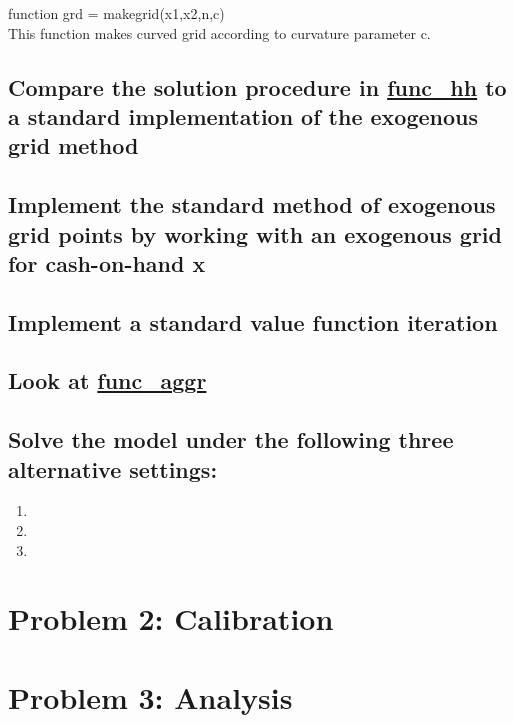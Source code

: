 \documentclass[12pt,a4paper]{article}
\newcommand\purl[1]{\protect\url{#1}} %
\begin{document}
function grd = makegrid(x1,x2,n,c) \\
This function makes curved grid according to curvature parameter c. \\

\subsection*{Compare the solution procedure in \purl{func_hh} to a standard implementation of the exogenous grid method}

\subsection*{Implement the standard method of exogenous grid points by working with an exogenous grid for cash-on-hand x}

\subsection*{Implement a standard value function iteration}

\subsection*{Look at \purl{func_aggr}}

\subsection*{Solve the model under the following three alternative settings:}

\begin{enumerate}
\item
\item
\item
\end{enumerate}

\section*{Problem 2: Calibration}

\section*{Problem 3: Analysis}
\end{document}

